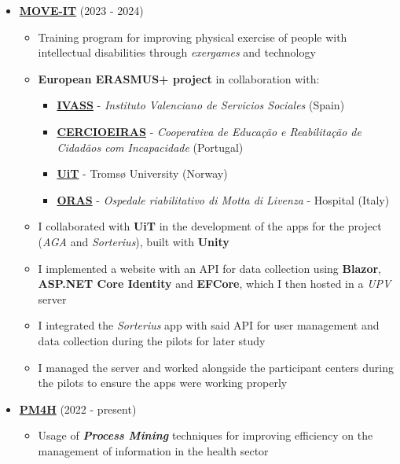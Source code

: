 \documentclass[letterpaper, 12pt, dvipsnames]{article}
\newcommand{\upv}{UPV}
\begin{document}
\begin{itemize}
    \item {\large\textbf{\href{https://moveit.webs.upv.es/}{MOVE-IT}}} (2023 - 2024)
          \begin{itemize}
              \item Training program for improving physical exercise of people with intellectual disabilities through \textit{exergames} and technology
              \item \textbf{European ERASMUS+ project} in collaboration with:
                    \begin{itemize}
                        \item \textbf{\href{https://www.ivass.gva.es/}{IVASS}} - \textit{Instituto Valenciano de Servicios Sociales} (Spain)
                        \item \textbf{\href{https://www.cercioeiras.pt/pt}{CERCIOEIRAS}} - \textit{Cooperativa de Educação e Reabilitação de Cidadãos com Incapacidade} (Portugal)
                        \item \textbf{\href{https://en.uit.no/}{UiT}} - Tromsø University (Norway)
                        \item \textbf{\href{https://www.ospedalemotta.it/it/}{ORAS}} - \textit{Ospedale riabilitativo di Motta di Livenza} - Hospital (Italy)
                    \end{itemize}
              \item I collaborated with \textbf{UiT} in the development of the apps for the project (\textit{AGA} and \textit{Sorterius}), built with \textbf{Unity}
              \item I implemented a website with an API for data collection using \textbf{Blazor}, \textbf{ASP.NET Core Identity} and \textbf{EFCore}, which I then hosted in a \textit{\upv} server
              \item I integrated the \textit{Sorterius} app with said API for user management and data collection during the pilots for later study
              \item I managed the server and worked alongside the participant centers during the pilots to ensure the apps were working properly
          \end{itemize}
    \item {\large\textbf{\href{https://pm4health.com/}{PM4H}}} (2022 - present)
          \begin{itemize}
              \item Usage of \textbf{\emph{Process Mining}} techniques for improving efficiency on the management of information in the health sector

\end{itemize}
\end{itemize}
\end{document}
